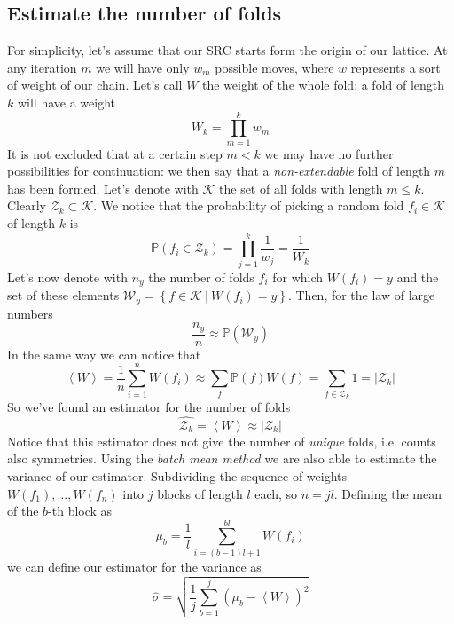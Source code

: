 \subsection{Estimate the number of folds}
For simplicity, let's assume that our SRC starts form the origin of our lattice.
At any iteration $m$ we will have only $w_m$ possible moves, where $w$ represents a sort of weight of our chain.
Let's call $W$ the weight of the whole fold: a fold of length $k$ will have a weight
\begin{equation*}
    W_k = \prod_{m=1}^k w_m
\end{equation*}
It is not excluded that at a certain step $m < k$ we may have no further possibilities for continuation: we then say that a \emph{non-extendable} fold of length $m$ has been formed.
Let's denote with $\mathcal{K}$ the set of all folds with length $m \leq k$.
Clearly $\mathcal{Z}_k \subset \mathcal{K}$.
We notice that the probability of picking a random fold $f_i \in \mathcal{K}$ of length $k$ is
\begin{equation*}
    \mathbb{P}\left(f_i \in \mathcal{Z}_k\right) = \prod_{j=1}^k \frac{1}{w_j} = \frac{1}{W_k}
\end{equation*}
Let's now denote with $n_y$ the number of folds $f_i$ for which $W\left(f_i\right) = y$ and the set of these elements $\mathcal{W}_y = \left\{f \in \mathcal{K} \ | \ W\left(f_i\right) = y\right\}$.
Then, for the law of large numbers
\begin{equation*}
    \frac{n_y}{n} \approx \mathbb{P}\left(\mathcal{W}_y\right)
\end{equation*}
In the same way we can notice that
\begin{equation*}
    \left\langle W \right\rangle = \frac{1}{n} \sum_{i=1}^n W\left(f_i\right) \approx \sum_f \mathbb{P}\left(f\right)W\left(f\right) = \sum_{f \in \mathcal{Z}_k} 1 = \left\lvert \mathcal{Z}_k \right\rvert
\end{equation*}
So we've found an estimator for the number of folds
\begin{equation}
    \hat{\mathcal{Z}_k} = \left\langle W \right\rangle \approx \left\lvert \mathcal{Z}_k \right\rvert
\end{equation}
Notice that this estimator does not give the number of \emph{unique} folds, i.e. counts also symmetries.
Using the \emph{batch mean method} we are also able to estimate the variance of our estimator.
Subdividing the sequence of weights $W\left(f_1\right),\ldots,W\left(f_n\right)$ into $j$ blocks of length $l$ each, so $n = jl$.
Defining the mean of the $b$-th block as
\begin{equation*}
    \mu_b = \frac{1}{l} \sum_{i = (b-1)l + 1}^{bl} W\left(f_i\right)
\end{equation*}
we can define our estimator for the variance as
\begin{equation}
    \hat{\sigma} = \sqrt{\frac{1}{j} \sum_{b = 1}^j \left(\mu_b - \left\langle W \right\rangle\right)^2}
\end{equation}